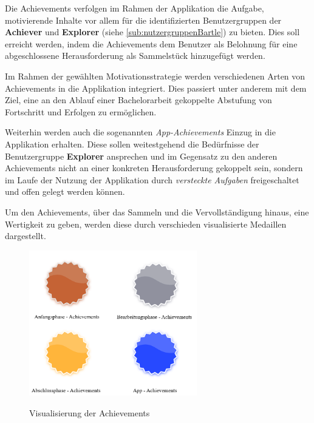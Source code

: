 \documentclass[bibliography=totoc,listof=totoc,BCOR=5mm,DIV=12,oneside]{scrbook}
\begin{document}
\par \bigskip Die Achievements verfolgen im Rahmen der Applikation die Aufgabe, motivierende Inhalte vor allem für die identifizierten Benutzergruppen der \textbf{Achiever} und \textbf{Explorer} (siehe \ref{sub:nutzergruppenBartle}) zu bieten. Dies soll erreicht werden, indem die Achievements dem Benutzer als Belohnung für eine abgeschlossene Herausforderung als Sammelstück hinzugefügt werden.
\par \medskip Im Rahmen der gewählten Motivationsstrategie werden verschiedenen Arten von Achievements in die Applikation integriert. Dies passiert unter anderem mit dem Ziel, eine an den Ablauf einer Bachelorarbeit gekoppelte Abstufung von Fortschritt und Erfolgen zu ermöglichen. 
\par Weiterhin werden auch die sogenannten \textit{App-Achievements} Einzug in die Applikation erhalten. Diese sollen weitestgehend die Bedürfnisse der Benutzergruppe \textbf{Explorer} ansprechen und im Gegensatz zu den anderen Achievements nicht an einer konkreten Herausforderung gekoppelt sein, sondern im Laufe der Nutzung der Applikation durch \textit{versteckte Aufgaben} freigeschaltet und offen gelegt werden können.

\par \medskip Um den Achievements, über das Sammeln und die Vervollständigung hinaus, eine Wertigkeit zu geben, werden diese durch verschieden visualisierte Medaillen dargestellt. 

\bigskip
\begin{figure}[H]
\centering

	{\includegraphics[width=0.65\textwidth]{Bilder/AchievementsVisualisierung.png}}

	\caption{Visualisierung der Achievements}
	\label{img:achievements}
\end{figure}
\end{document}
